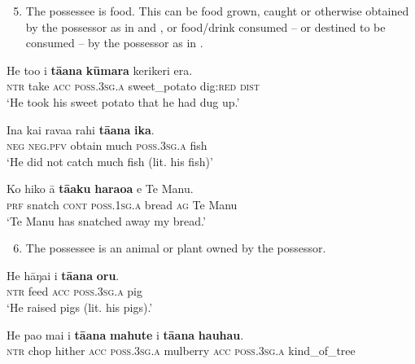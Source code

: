 \begin{enumerate}
\setcounter{enumi}{4}
\item 
The possessee is food. This can be food grown, caught or otherwise obtained by the possessor as in  and , or food/drink consumed – or destined to be consumed – by the possessor as in .

\end{enumerate}

\ea\label{ex:6.76}
\gll He to{\ꞌ}o i \textbf{tā{\ꞌ}ana} \textbf{kūmara} kerikeri era. \\
\textsc{ntr} take \textsc{acc} \textsc{poss.3sg.a} sweet\_potato dig:\textsc{red} \textsc{dist} \\

\glt 
‘He took his sweet potato that he had dug up.’ \textstyleExampleref{[Mtx-7-25.022]}
\z

\ea\label{ex:6.77}
\gll {\ꞌ}Ina kai rava{\ꞌ}a rahi \textbf{tā{\ꞌ}ana} \textbf{ika}. \\
\textsc{neg} \textsc{neg.pfv} obtain much \textsc{poss.3sg.a} fish \\

\glt
‘He did not catch much fish (lit. his fish)’ \textstyleExampleref{[R312.004]} 
\z


\ea\label{ex:6.78}
\gll Ko hiko {\ꞌ}ā \textbf{tā{\ꞌ}aku} \textbf{haraoa} e Te Manu. \\
\textsc{prf} snatch \textsc{cont} \textsc{poss.1sg.a} bread \textsc{ag} Te Manu \\

\glt
‘Te Manu has snatched away my bread.’ \textstyleExampleref{[R245.039]} 
\z

\begin{enumerate}
\setcounter{enumi}{5} 
\item 
The possessee is an animal or plant owned by the possessor. 

\end{enumerate}

\ea\label{ex:6.79}
\gll He hāŋai i \textbf{tā{\ꞌ}ana} \textbf{oru}. \\
\textsc{ntr} feed \textsc{acc} \textsc{poss.3sg.a} pig \\

\glt 
‘He raised pigs (lit. his pigs).’ \textstyleExampleref{[R423.019]} 
\z

\ea\label{ex:6.80}
\gll He pa{\ꞌ}o mai i \textbf{tā{\ꞌ}ana} \textbf{mahute} i \textbf{tā{\ꞌ}ana} \textbf{hauhau}. \\
\textsc{ntr} chop hither \textsc{acc} \textsc{poss.3sg.a} mulberry \textsc{acc} \textsc{poss.3sg.a} kind\_of\_tree \\

